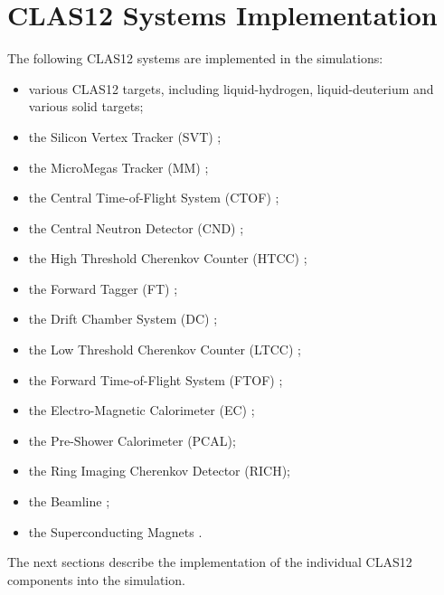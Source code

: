 \section{CLAS12 Systems Implementation}

The following CLAS12 systems are implemented in the simulations:

\begin{itemize}
\item various CLAS12 targets, including liquid-hydrogen, liquid-deuterium and various solid targets;
\item the Silicon Vertex Tracker (SVT) \cite{svt-nim};
\item the MicroMegas Tracker (MM) \cite{mm-nim};
\item the Central Time-of-Flight System (CTOF) \cite{ctof-nim};
\item the Central Neutron Detector (CND) \cite{cnd-nim};
\item the High Threshold Cherenkov Counter (HTCC) \cite{htcc-nim};
\item the Forward Tagger (FT) \cite{ft-nim};
\item the Drift Chamber System (DC) \cite{dc-nim};
\item the Low Threshold Cherenkov Counter (LTCC) \cite{ltcc-nim};
\item the Forward Time-of-Flight System (FTOF) \cite{ftof-nim};
\item the Electro-Magnetic Calorimeter (EC) \cite{Amarian:2001zs};
\item the Pre-Shower Calorimeter (PCAL)\cite{ec-nim};
\item the Ring Imaging Cherenkov Detector (RICH)\cite{rich-nim};
\item the Beamline \cite{beamline-nim};
\item the Superconducting Magnets \cite{magnets-nim}.
\end{itemize}


The next sections describe the implementation of the individual CLAS12 components into the simulation.
